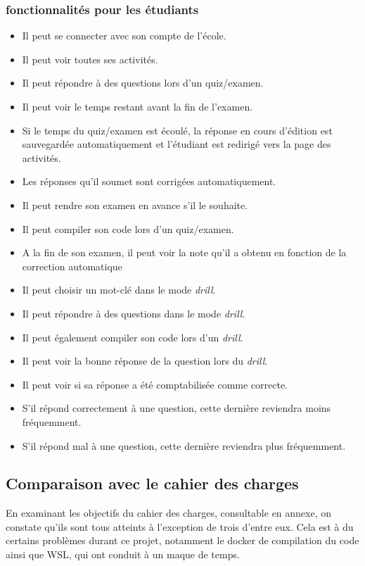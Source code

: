 \subsubsection{fonctionnalités pour les étudiants}
\begin{itemize}
    \item Il peut se connecter avec son compte de l'école.
    \item Il peut voir toutes ses activités.
    \item Il peut répondre à des questions lors d'un quiz/examen.
    \item Il peut voir le temps restant avant la fin de l'examen.
    \item Si le temps du quiz/examen est écoulé, la réponse en cours d'édition est sauvegardée automatiquement et l'étudiant est redirigé vers la page des activités.
    \item Les réponses qu'il soumet sont corrigées automatiquement.
    \item Il peut rendre son examen en avance s'il le souhaite.
    \item Il peut compiler son code lors d'un quiz/examen.
    \item A la fin de son examen, il peut voir la note qu'il a obtenu en fonction de la correction automatique
    \item Il peut choisir un mot-clé dans le mode \emph{drill}.
    \item Il peut répondre à des questions dans le mode \emph{drill}.
    \item Il peut également compiler son code lors d'un \emph{drill}.
    \item Il peut voir la bonne réponse de la question lors du \emph{drill}.
    \item Il peut voir si sa réponse a été comptabilisée comme correcte.
    \item S'il répond correctement à une question, cette dernière reviendra moins fréquemment.
    \item S'il répond mal à une question, cette dernière reviendra plus fréquemment.
\end{itemize}

\subsection{Comparaison avec le cahier des charges}
En examinant les objectifs du cahier des charges, consultable en annexe, on constate qu'ils sont tous atteints à l'exception de trois d'entre eux. Cela est à du certains problèmes durant ce projet, notamment le docker de compilation du code ainsi que WSL, qui ont conduit à un maque de temps.

